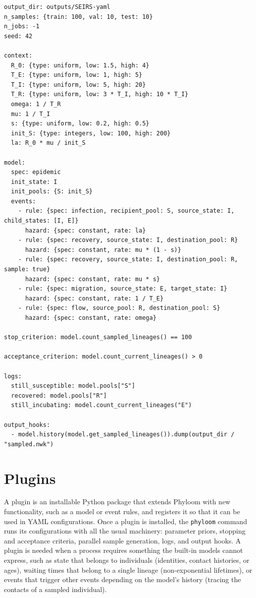 \documentclass[11pt]{article}
\begin{document}
\begin{lstlisting}[style=cfg]
output_dir: outputs/SEIRS-yaml
n_samples: {train: 100, val: 10, test: 10}
n_jobs: -1
seed: 42

context:
  R_0: {type: uniform, low: 1.5, high: 4}
  T_E: {type: uniform, low: 1, high: 5}
  T_I: {type: uniform, low: 5, high: 20}
  T_R: {type: uniform, low: 3 * T_I, high: 10 * T_I}
  omega: 1 / T_R
  mu: 1 / T_I
  s: {type: uniform, low: 0.2, high: 0.5}
  init_S: {type: integers, low: 100, high: 200}
  la: R_0 * mu / init_S

model:
  spec: epidemic
  init_state: I
  init_pools: {S: init_S}
  events:
    - rule: {spec: infection, recipient_pool: S, source_state: I, child_states: [I, E]}
      hazard: {spec: constant, rate: la}
    - rule: {spec: recovery, source_state: I, destination_pool: R}
      hazard: {spec: constant, rate: mu * (1 - s)}
    - rule: {spec: recovery, source_state: I, destination_pool: R, sample: true}
      hazard: {spec: constant, rate: mu * s}
    - rule: {spec: migration, source_state: E, target_state: I}
      hazard: {spec: constant, rate: 1 / T_E}
    - rule: {spec: flow, source_pool: R, destination_pool: S}
      hazard: {spec: constant, rate: omega}

stop_criterion: model.count_sampled_lineages() == 100

acceptance_criterion: model.count_current_lineages() > 0

logs:
  still_susceptible: model.pools["S"]
  recovered: model.pools["R"]
  still_incubating: model.count_current_lineages("E")

output_hooks:
  - model.history(model.get_sampled_lineages()).dump(output_dir / "sampled.nwk")
\end{lstlisting}

\section{Plugins}
\label{sec:app-plugins}

A plugin is an installable Python package that extends Phyloom with new
functionality, such as a model or event rules, and registers it so that it can
be used in YAML configurations. Once a plugin is installed, the \texttt{phyloom}
command runs its configurations with all the usual machinery: parameter priors,
stopping and acceptance criteria, parallel sample generation, logs, and output
hooks. A plugin is needed when a process requires something the built-in models
cannot express, such as state that belongs to individuals (identities, contact
histories, or ages), waiting times that belong to a single lineage
(non-exponential lifetimes), or events that trigger other events depending on
the model's history (tracing the contacts of a sampled individual).
\end{document}
